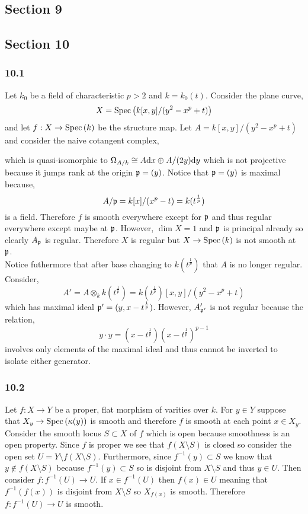 \documentclass[12pt]{article}
\begin{document}
\subsection{Section 9}

\subsection{Section 10}


\subsubsection{10.1}

Let $k_0$ be a field of characteristic $p > 2$ and $k = k_0(t)$. Consider the plane curve,
\[ X = \mathrm{Spec}\left( k[x,y]/(y^2 - x^p + t) \right) \]
and let $f : X \to \mathrm{Spec}\left( k \right)$ be the structure map. Let $A = k[x,y]/(y^2 - x^p + t)$ and consider the naive cotangent complex,
\begin{center}
\end{center}
which is quasi-isomorphic to $\Omega_{A/k} \cong A \mathrm{d}{x} \oplus A/(2y) \mathrm{d}{y}$ which is not projective because it jumps rank at the origin $\mathfrak{p} = (y)$. Notice that $\mathfrak{p} = (y)$ is maximal because,
\[ A/\mathfrak{p} = k[x]/(x^p - t) = k(t^{\frac{1}{p}}) \]
is a field. Therefore $f$ is smooth everywhere except for $\mathfrak{p}$ and thus regular everywhere except maybe at $\mathfrak{p}$. However, $\dim{X} = 1$ and $\mathfrak{p}$ is principal already so clearly $A_{\mathfrak{p}}$ is regular. Therefore $X$ is regular but $X \to \mathrm{Spec}\left( k \right)$ is not smooth at $\mathfrak{p}$. 
\bigskip\\
Notice futhermore that after base changing to $k(t^{\frac{1}{p}})$ that $A$ is no longer regular. Consider,
\[ A' = A \otimes_k k(t^{\frac{1}{p}}) = k(t^{\frac{1}{p}})[x, y]/(y^2 - x^p + t) \]
which has maximal ideal $\mathfrak{p}' = (y, x - t^{\frac{1}{p}})$. However, $A'_{\mathfrak{p}'}$ is not regular because the relation,
\[ y \cdot y = (x - t^{\frac{1}{p}})(x - t^{\frac{1}{p}})^{p - 1} \]
involves only elements of the maximal ideal and thus cannot be inverted to isolate either generator.

\subsubsection{10.2}

Let $f : X \to Y$ be a proper, flat morphism of varities over $k$. For $y \in Y$ suppose that $X_y \to \mathrm{Spec}\left( \kappa(y) \right)$ is smooth and therefore $f$ is smooth at each point $x \in X_y$. Consider the smooth locus $S \subset X$ of $f$ which is open because smoothness is an open property. Since $f$ is proper we see that $f(X \setminus S)$ is closed so consider the open set $U = Y \setminus f(X \setminus S)$. Furthermore, since $f^{-1}(y) \subset S$ we know that $y \notin f(X \setminus S)$ because $f^{-1}(y) \subset S$ so is disjoint from $X \setminus S$ and thus $y \in U$. Then consider $f : f^{-1}(U) \to U$. If $x \in f^{-1}(U)$ then $f(x) \in U$ meaning that $f^{-1}(f(x))$ is disjoint from $X \setminus S$ so $X_{f(x)}$ is smooth. Therefore $f : f^{-1}(U) \to U$ is smooth.
\end{document}
